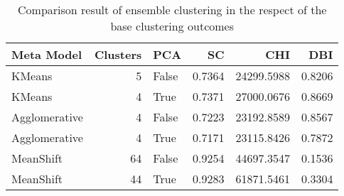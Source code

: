 \begin{table}[t]
\centering
\caption{Comparison result of ensemble clustering in the respect of the base clustering outcomes}
\label{tbl:meta_clustering_score_results}
\begin{tabular}{lrlrrr}
\toprule
   Meta Model &  Clusters &   PCA &     SC &        CHI &    DBI \\
\midrule
       KMeans &         5 & False & 0.7364 & 24299.5988 & 0.8206 \\
       KMeans &         4 &  True & 0.7371 & 27000.0676 & 0.8669 \\
Agglomerative &         4 & False & 0.7223 & 23192.8589 & 0.8567 \\
Agglomerative &         4 &  True & 0.7171 & 23115.8426 & 0.7872 \\
    MeanShift &        64 & False & 0.9254 & 44697.3547 & 0.1536 \\
    MeanShift &        44 &  True & 0.9283 & 61871.5461 & 0.3304 \\
\bottomrule
\end{tabular}
\end{table}
